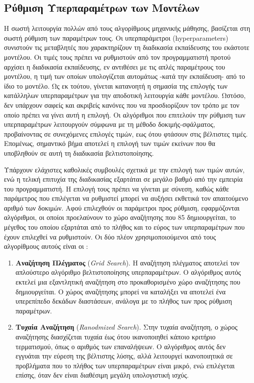 \documentclass[diploma]{softlab-thesis}
\begin{document}
\begin{enumerate}
\begin{enumerate}
\section{Ρύθμιση Υπερπαραμέτρων των Μοντέλων}

Η σωστή λειτουργία πολλών από τους αλγορίθμους μηχανικής μάθησης, βασίζεται στη σωστή ρύθμιση των παραμέτρων τους. Οι υπερπαράμετροι (hyperparameters) συνιστούν τις μεταβλητές που χαρακτηρίζουν τη διαδικασία εκπαίδευσης του εκάστοτε μοντέλου. Οι τιμές τους πρέπει να ρυθμιστούν από τον προγραμματιστή προτού αρχίσει η διαδικασία εκπαίδευσης, εν αντιθέσει με τις απλές παραμέτρους του μοντέλου, η τιμή των οποίων υπολογίζεται αυτομάτως -κατά την εκπαίδευση- από το ίδιο το μοντέλο. Ως εκ τούτου, γίνεται κατανοητή η σημασία της επιλογής των κατάλληλων υπερπαραμέτρων για την αποδοτική λειτουργία κάθε μοντέλου. Ωστόσο, δεν υπάρχουν σαφείς και ακριβείς κανόνες που να προσδιορίζουν τον τρόπο με τον οποίο πρέπει να γίνει αυτή η επιλογή. Οι αλγόριθμοι που επιτελούν την ρύθμιση των υπερπαραμέτρων λειτουργούν σύμφωνα με τη μέθοδο δοκιμής-σφάλματος, προβαίνοντας σε συνεχόμενες επιλογές τιμών, εως ότου φτάσουν στις βέλτιστες τιμές. Επομένως, σημαντικό βήμα αποτελεί η επιλογή των τιμών εκείνων που θα υποβληθούν σε αυτή τη διαδικασία βελτιστοποίησης.

Υπάρχουν ελάχιστες καθολικές συμβουλές σχετικά με την επιλογή των τιμών αυτών, ενώ η τελική επιτυχία της
διαδικασίας εξαρτάται σε μεγάλο βαθμό από την εμπειρία του προγραμματιστή. Η επιλογή τους πρέπει να γίνεται με σύνεση, καθώς κάθε παράμετρος που επιλέγεται να ρυθμιστεί μπορεί να αυξήσει εκθετικά τον απαιτούμενο αριθμό των δοκιμών. Αφού επιλεχθούν οι παράμετροι προς ρύθμιση, εφαρμόζονται αλγόριθμοι, οι οποίοι προελαύνουν το χώρο αναζήτησης που 85 δημιουργείται, το μέγεθος του οποίου εξαρτάται από το πλήθος και το εύρος των υπερπαραμέτρων που έχουν επιλεχθεί να ρυθμιστούν. Οι δύο πλέον χρησιμοποιούμενοι από τους αλγορίθμους αυτούς είναι οι :
\vspace{0.5cm}




\begin{enumerate}
\item \textbf{Αναζήτηση Πλέγματος} (\textit{Grid Search}). Η αναζήτηση πλέγματος αποτελεί τον απλούστερο αλγόριθμο βελτιστοποίησης υπερπαραμέτρων. Ο αλγόριθμος αυτός εκτελεί μια εξαντλητική αναζήτηση στο προκαθορισμένο χώρο αναζήτησης που δημιουργείται. Ο χώρος αναζήτησης μπορεί να καταλήξει να αποτελεί ένα υπερεπίπεδο δεκάδων διαστάσεων, ανάλογα με το πλήθος των προς ρύθμιση παραμέτρων. 
\item \textbf{Τυχαία Αναζήτηση} (\textit{Ranodmized Search}). Στην τυχαία αναζήτηση, ο χώρος αναζήτησης διασχίζεται τυχαία έως ότου ικανοποιηθεί κάποιο κριτήριο τερματισμού, όπως ο αριθμός των επαναλήψεων. Ο αλγόριθμος αυτός δεν εγγυάται την εύρεση της βέλτιστης λύσης, αλλά λειτουργεί ικανοποιητικά σε προβλήματα που το πλήθος των υπερπαραμέτρων είναι μικρό, ενώ επιλέγεται επίσης, όταν δεν είναι διαθέσιμη μεγάλη υπολογιστική ισχύς.
\end{enumerate}
\vspace{0.5cm}





\end{enumerate}
\end{enumerate}
\end{document}
